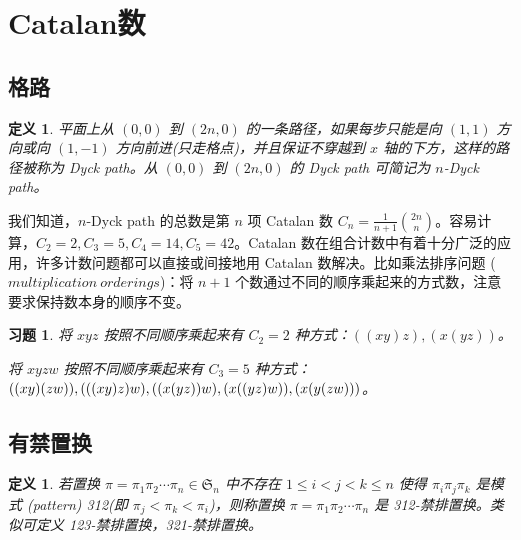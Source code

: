 \documentclass[a4paper,11pt]{article}
\newtheorem{defi}[thm]{定义}
\newtheorem{ex}[thm]{习题}
\begin{document}
%






\clearpage




\section{Catalan数}
\subsection{格路}
\begin{defi}
平面上从 $(0, 0)$ 到 $(2n, 0)$ 的一条路径，如果每步只能是向 $(1, 1)$
方向或向 $(1, -1)$ 方向前进(只走格点)，并且保证不穿越到 $x$
轴的下方，这样的路径被称为 Dyck path。从 $(0, 0)$ 到 $(2n, 0)$ 的
Dyck path 可简记为 $n$-Dyck path。
\end{defi}
我们知道，$n$-Dyck path 的总数是第 $n$ 项 Catalan 数
$C_{n}=\frac{1}{n+1}{2n\choose n}$。容易计算，$C_{2}=2, C_{3}=5,
C_{4}=14, C_{5}=42$。Catalan
数在组合计数中有着十分广泛的应用，许多计数问题都可以直接或间接地用
Catalan 数解决。比如乘法排序问题 ($multiplication\ orderings$)：将
$n+1$
个数通过不同的顺序乘起来的方式数，注意要求保持数本身的顺序不变。

\begin{ex}
将 $xyz$ 按照不同顺序乘起来有 $C_{2}=2$ 种方式：$((xy)z), (x(yz))$。

将 $xyzw$ 按照不同顺序乘起来有 $C_{3}=5$ 种方式：$((xy)(zw)),
(((xy)z)w), \\((x(yz))w), (x((yz)w)), (x(y(zw)))$。
\end{ex}
\subsection{有禁置换}

\begin{defi}
若置换 $\pi=\pi_1\pi_2\cdots\pi_n\in\mathfrak{S}_n$ 中不存在 $1\le
i<j<k\le n$ 使得 $\pi_i\pi_j\pi_k$ 是模式 (pattern) 312(即
$\pi_j<\pi_k<\pi_i$)，则称置换 $\pi=\pi_1\pi_2\cdots\pi_n$ 是
312-禁排置换。类似可定义 123-禁排置换，321-禁排置换。
\end{defi}
\end{document}
